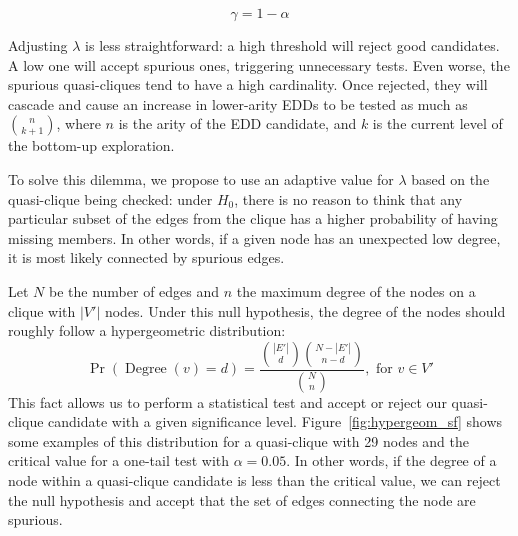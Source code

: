 \begin{equation*}
    \gamma = 1 - \alpha   
\end{equation*}

Adjusting $\lambda$ is less straightforward: a high threshold
will reject good candidates. A low one will accept spurious ones, triggering
unnecessary tests. Even worse, the spurious quasi-cliques tend to have a high cardinality.
Once rejected, they will cascade and cause an increase in lower-arity \glspl{EDD}
to be tested as much as $\binom{n}{k+1}$, where $n$ is the arity of the \gls{EDD} candidate,
and $k$ is the current level of the bottom-up exploration.

To solve this dilemma, we propose to use an adaptive value for $\lambda$ based on the
quasi-clique being checked: under $H_0$, there is no reason to think that any
particular subset of the edges from the clique has a higher probability of
having missing members. In other words, if a given node has an
unexpected low degree, it is most likely connected by spurious edges.

Let $N$ be the number of edges and $n$ the
maximum degree of the nodes on a clique with $|V'|$ nodes. Under this null hypothesis,
the degree of the nodes should roughly follow a hypergeometric distribution:
\begin{equation}
    \Pr(\operatorname{Degree}(v) = d)  = \frac{\binom{|E'|}{d} \binom{N - |E'|}{n - d}}{\binom{N}{n}}, \textrm{ for } v \in V'
    \label{eq:hypergeometric}
\end{equation}
This fact allows us to perform a statistical test and accept or reject our
quasi-clique candidate with a given significance level.
Figure~\ref{fig:hypergeom_sf} shows some examples of this distribution for a
quasi-clique with 29 nodes and the critical value for
a one-tail test with $\alpha = 0.05$. In other words, if the degree of a
node within a quasi-clique candidate is less than the critical value, we can reject the
null hypothesis and accept that the set of edges connecting the node are spurious.

